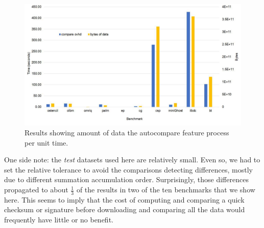 \begin{figure}[t]
    \centering
    \includegraphics [width=1\linewidth] {GBperSec.pdf}
    \caption{Results showing amount of data the autocompare feature process per unit time.}
    \label{fig:gbps_figure}
\end{figure}

One side note: the \emph{test} datasets used here are relatively small.
Even so, we had to set the relative tolerance to avoid the comparisons detecting differences, mostly due to different summation accumulation order.
Surprisingly, those differences propagated to about $\frac{1}{3}$ of the results in two of the ten benchmarks that we show here.
This seems to imply that the cost of computing and comparing a quick checksum or signature before downloading and comparing all the data would frequently have little or no benefit.
